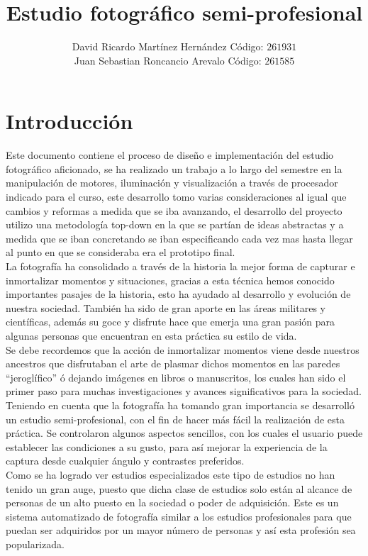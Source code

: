\documentclass[twocolumn]{IEEEtran}
\begin{document}
\title{\huge{Estudio fotográfico semi-profesional}}
\author{David Ricardo Martínez Hernández Código: $261931$\\
	Juan Sebastian Roncancio Arevalo Código: $261585$}
\date{}
\maketitle
{}

\section{Introducción}
\noindent
Este documento contiene el proceso de diseño e implementación del estudio fotográfico aficionado, se ha realizado un trabajo a lo largo del semestre en la manipulación de motores, iluminación y visualización a través de procesador indicado para el curso, este desarrollo tomo varias consideraciones al igual que cambios y reformas a medida que se iba avanzando, el desarrollo del proyecto utilizo una metodología top-down en la que se partían de ideas abstractas y a medida que se iban concretando se iban especificando cada vez mas hasta llegar al punto en que se consideraba era el prototipo final.\\
La fotografía ha consolidado a través de la historia la mejor forma de capturar e inmortalizar momentos y situaciones, gracias a esta técnica hemos conocido importantes pasajes de la historia, esto ha ayudado al desarrollo y evolución de nuestra sociedad. También ha sido de gran aporte en las áreas militares y científicas, además su goce y disfrute hace que emerja una gran pasión para algunas personas que encuentran en esta práctica su estilo de vida.\\
Se debe recordemos que la acción de inmortalizar momentos viene desde nuestros ancestros que disfrutaban el arte de plasmar dichos momentos en las paredes ``jeroglífico'' ó dejando imágenes en libros o manuscritos, los cuales han sido el primer paso para muchas investigaciones y avances significativos para la sociedad.\\
Teniendo en cuenta que la fotografía ha tomando gran importancia se desarrolló un estudio semi-profesional, con el fin de hacer más fácil la realización de esta práctica. Se controlaron algunos aspectos sencillos, con los cuales el usuario puede establecer las condiciones a su gusto, para así mejorar la experiencia de la captura desde cualquier ángulo y contrastes preferidos.\\
Como se ha logrado ver estudios especializados este tipo de estudios no han tenido un gran auge, puesto que dicha clase de estudios solo están al alcance de personas de un alto puesto en la sociedad o poder de adquisición. Este es un sistema automatizado de fotografía similar a los estudios profesionales para que puedan ser adquiridos por un mayor número de personas y así esta profesión sea popularizada.
\end{document}
